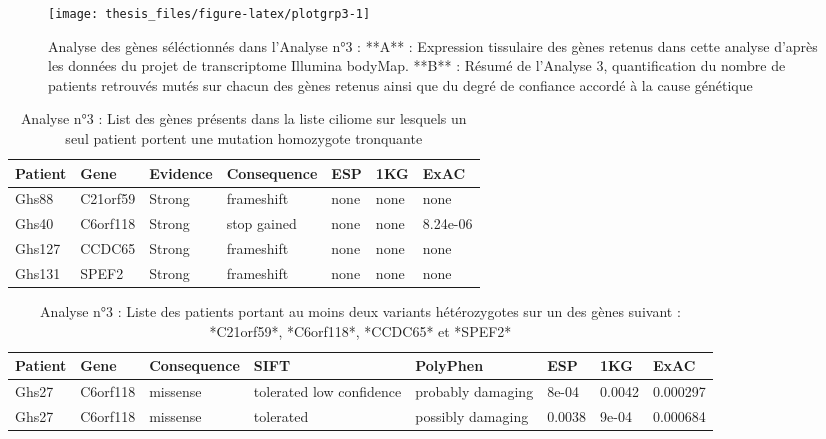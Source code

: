 \documentclass[12pt,twoside]{reedthesis}
\theoremstyle{definition}
\theoremstyle{definition}
\theoremstyle{remark}
\begin{document}
  \newpage  
  
  \begin{figure}
  
  {\centering \texttt{[image: thesis\_files/figure-latex/plotgrp3-1]} 
  
  }
  
  \caption[Analyse des gènes séléctionnés dans l'Analyse n°3]{Analyse des gènes séléctionnés dans l'Analyse n°3 : **A** : Expression tissulaire des gènes retenus dans cette analyse d'après les données du projet de transcriptome Illumina bodyMap. **B** : Résumé de l'Analyse 3, quantification du nombre de patients retrouvés mutés sur chacun des gènes retenus ainsi que du degré de confiance accordé à la cause génétique}\label{fig:plotgrp3}
  \end{figure}
  
  \newpage
  
  \begin{longtable}[t]{lllllll}
  \caption{\label{tab:tabgrp3high}Analyse n°3 : List des gènes présents dans la liste ciliome sur lesquels un seul patient portent une mutation homozygote tronquante}\\
  \toprule
  Patient & Gene & Evidence & Consequence & ESP & 1KG & ExAC\\
  \midrule
  Ghs88 & C21orf59 & Strong & frameshift & none & none & none\\
  Ghs40 & C6orf118 & Strong & stop gained & none & none & 8.24e-06\\
  Ghs127 & CCDC65 & Strong & frameshift & none & none & none\\
  Ghs131 & SPEF2 & Strong & frameshift & none & none & none\\
  \bottomrule
  \end{longtable}
  
  \begin{longtable}[t]{llllllll}
  \caption{\label{tab:tabgrp3low}Analyse n°3 : Liste des patients portant au moins deux variants hétérozygotes sur un des gènes suivant : *C21orf59*, *C6orf118*, *CCDC65*  et  *SPEF2*}\\
  \toprule
  Patient & Gene & Consequence & SIFT & PolyPhen & ESP & 1KG & ExAC\\
  \midrule
  Ghs27 & C6orf118 & missense & tolerated low confidence & probably damaging & 8e-04 & 0.0042 & 0.000297\\
  Ghs27 & C6orf118 & missense & tolerated & possibly damaging & 0.0038 & 9e-04 & 0.000684\\
  \bottomrule
  \end{longtable}
  
\end{document}
